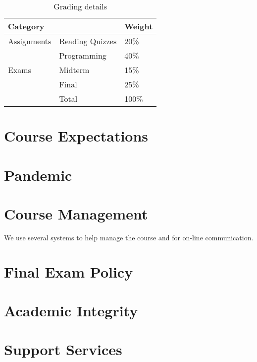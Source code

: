 \documentclass[11pt]{article}
\begin{document}
\begin{table}[htb]
  \centering
  \begin{tabular}{lll}
    \toprule
    Category    &                 & Weight \\
    \midrule
    Assignments & Reading Quizzes & 20\%   \\
                & Programming     & 40\%   \\
    Exams       & Midterm         & 15\%   \\
                & Final           & 25\%   \\
    \midrule
                & Total           & 100\%  \\
    \bottomrule
  \end{tabular}
  \caption{Grading details}
  \label{tab:grading}
\end{table}

\begin{comment}
  #+ORGTBL: SEND grades orgtbl-to-latex :splice nil :skip 0 :booktabs t
  | Category    |                 | Weight |
  |-------------+-----------------+--------|
  | Assignments | Reading Quizzes |    20%
  |             | Programming     |    40%
  | Exams       | Midterm         |    15%
  |             | Final           |    25%
  |-------------+-----------------+--------|
  |             | Total           |   100%
  #+TBLFM: @7$3=100*vsum(@I..II);%
\end{comment}

\section{Course Expectations}



\section{Pandemic}



\section{Course Management}

We use several systems to help manage the course
and for on-line communication.





\section{Final Exam Policy}



\section{Academic Integrity}



\section{Support Services}



\lastupdated
\end{document}
